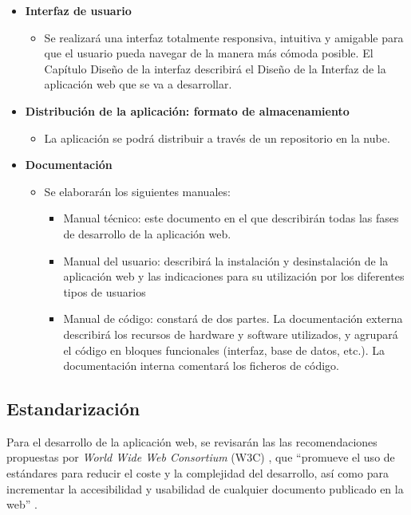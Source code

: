 \begin{itemize}
    \item \textbf{Interfaz de usuario}
    \begin{itemize}
        \item Se realizará una interfaz totalmente responsiva, intuitiva y amigable para que el usuario pueda navegar de la manera más cómoda posible. El Capítulo Diseño de la interfaz describirá el Diseño de la Interfaz de la aplicación web que se va  a desarrollar.
    \end{itemize}
    \item \textbf{Distribución de la aplicación: formato de almacenamiento}
     \begin{itemize}
         \item La aplicación se podrá distribuir a través de un repositorio en la nube.
     \end{itemize}
     
    \item \textbf{Documentación}
     \begin{itemize}
         \item Se elaborarán los siguientes manuales:
        \begin{itemize}
        \item Manual técnico: este documento en el que describirán todas las fases de desarrollo de la aplicación web.
        \item Manual del usuario: describirá la instalación y desinstalación de la aplicación web y las indicaciones para su utilización por los diferentes tipos de usuarios
        \item Manual de código: constará de dos partes. La documentación externa describirá los recursos de hardware y software utilizados, y agrupará el código en bloques funcionales (interfaz, base de datos, etc.). La documentación interna comentará los ficheros de código.
    \end{itemize}
     \end{itemize}
\end{itemize}


\subsection{Estandarización}

 Para el desarrollo de la aplicación web, se revisarán las 
 las recomendaciones propuestas por \textit{World Wide Web Consortium} (W3C) \cite{w3c}, que ``promueve el uso de estándares para reducir el coste y la complejidad del desarrollo, así como para incrementar la accesibilidad y usabilidad de cualquier documento publicado en la web'' \cite{revistadigital}.

